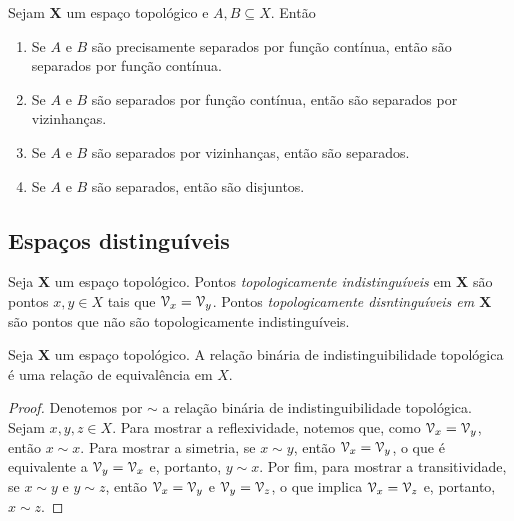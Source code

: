 \begin{proposition}
\label{topo:prop.separacao}
Sejam $\bm X$ um espaço topológico e $A,B \subseteq X$. Então
	\begin{enumerate}
	\item Se $A$ e $B$ são precisamente separados por função contínua, então são separados por função contínua.
	\item Se $A$ e $B$ são separados por função contínua, então são separados por vizinhanças.
	\item Se $A$ e $B$ são separados por vizinhanças, então são separados.
	\item Se $A$ e $B$ são separados, então são disjuntos.
	\end{enumerate}
\end{proposition}



\subsection{Espaços distinguíveis}

\begin{definition}
Seja $\bm X$ um espaço topológico. Pontos \emph{topologicamente indistinguíveis} em $\bm X$ são pontos $x,y \in X$ tais que $\mathcal{V}_x = \mathcal{V}_y$. Pontos \emph{topologicamente disntinguíveis em $\bm X$} são pontos que não são topologicamente indistinguíveis.
\end{definition}

\begin{proposition}
Seja $\bm X$ um espaço topológico. A relação binária de indistinguibilidade topológica é uma relação de equivalência em $X$.
\end{proposition}
\begin{proof}
Denotemos por $\sim$ a relação binária de indistinguibilidade topológica. Sejam $x,y,z \in X$. Para mostrar a reflexividade, notemos que, como $\mathcal{V}_x=\mathcal{V}_y$, então $x \sim x$. Para mostrar a simetria, se $x \sim y$, então $\mathcal{V}_x=\mathcal{V}_y$, o que é equivalente a $\mathcal{V}_y=\mathcal{V}_x$ e, portanto, $y \sim x$. Por fim, para mostrar a transitividade, se $x \sim y$ e $y \sim z$, então $\mathcal{V}_x=\mathcal{V}_y$ e $\mathcal{V}_y=\mathcal{V}_z$, o que implica $\mathcal{V}_x=\mathcal{V}_z$ e, portanto, $x \sim z$.
\end{proof}

